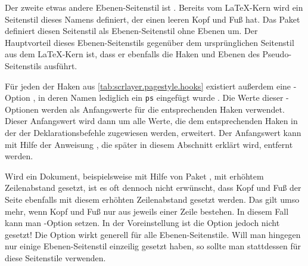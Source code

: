 Der zweite etwas andere Ebenen-Seitenstil ist
. Bereits vom \LaTeX-Kern wird
ein Seitenstil dieses Namens definiert, der einen leeren Kopf und Fuß hat. Das
Paket  definiert diesen Seitenstil als Ebenen-Seitenstil
ohne Ebenen um. \iffalse %
Nichtsdestotrotz kann er wie jeder andere Ebenen-Seitenstil verwendet
werden. %
\fi%
Der Hauptvorteil dieses Ebenen-Seitenstils gegenüber dem ursprünglichen
Seitenstil aus dem \LaTeX-Kern ist, dass er ebenfalls die Haken
und Ebenen des Pseudo-Seitenstils  ausführt.%
\EndIndexGroup


\begin{Declaration}
\end{Declaration}
%
%
Für jeden der Haken aus \autoref{tab:scrlayer.pagestyle.hooks}
existiert außerdem eine \KOMAScript-Option%
\iffalse%
. Die Namen der \KOMAScript-Optionen ähneln den Namen der Optionen für die
Befehle zur Deklaration von Ebenen-Seitenstilen. Es wird lediglich ein
»\texttt{ps}« nach dem »\texttt{on}« am Anfang des Namens eingefügt%
\else%
, in deren Namen lediglich ein \texttt{ps} eingefügt wurde%
\fi%
. Die Werte dieser \KOMAScript-Optionen werden als Anfangswerte für die
entsprechenden Haken verwendet. Dieser Anfangswert wird dann um alle Werte,
die dem entsprechenden Haken in der  der
Deklarationsbefehle zugewiesen werden, erweitert. Der Anfangswert kann mit
Hilfe der Anweisung , die
später in diesem Abschnitt erklärt wird, entfernt werden.%
\EndIndexGroup


\begin{Declaration}
\end{Declaration}
Wird ein
Dokument, beispielsweise mit Hilfe von Paket
, mit
erhöhtem Zeilenabstand gesetzt, ist es oft dennoch nicht erwünscht, dass Kopf
und Fuß der Seite ebenfalls mit diesem erhöhten Zeilenabstand gesetzt
werden. Das gilt umso mehr, wenn Kopf und Fuß nur aus jeweils einer Zeile
bestehen. In diesem Fall kann man \KOMAScript-Option 
setzen. In der Voreinstellung ist die Option jedoch
nicht gesetzt! Die Option wirkt generell für alle Ebenen-Seitenstile. Will man
hingegen nur einige Ebenen-Seitenstil einzeilig gesetzt haben, so sollte man
stattdessen für diese Seitenstile
verwenden.%
\EndIndexGroup


